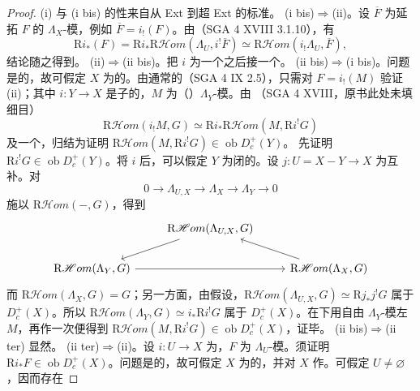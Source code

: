 \begin{proof}
(i) 与 (i bis) 的性来自从 Ext 到超 Ext 的标准。
(i bis)$\Rightarrow$(ii)。设 $\overline F$ 为延拓 $F$ 的 $\Lambda_X$-模，例如 $\overline F=i_!(F)$。由（SGA 4 XVIII 3.1.10），有
\[
\mathrm Ri_*(F)=\mathrm Ri_*\mathrm R\mathscr Hom(\Lambda_U,i^!\overline F)
\simeq\mathrm R\mathscr Hom(i_!\Lambda_U,\overline F),
\]
结论随之得到。
(ii)$\Rightarrow$(ii bis)。把 $i$ 为一个之后接一个。
(ii bis)$\Rightarrow$(i bis)。问题是的，故可假定 $X$ 为的。由通常的（SGA 4 IX 2.5），只需对 $F=i_!(M)$ 验证 (ii)；其中 $i:Y\to X$ 是子的，$M$ 为（）$\Lambda_Y$-模。由
（SGA 4 XVIII，原书此处未填细目）
\[
\mathrm R\mathscr Hom(i_!M,G)\simeq\mathrm Ri_*\mathrm R\mathscr Hom(M,\mathrm Ri^!G)
\]
及一个，归结为证明 $\mathrm R\mathscr Hom(M,\mathrm Ri^!G)\in\operatorname{ob}D_c^+(Y)$。
先证明 $\mathrm Ri^!G\in\operatorname{ob}D_c^+(Y)$。将 $i$ 后，可以假定 $Y$ 为闭的。设 $j:U=X-Y\to X$ 为互补。对
\[0\longrightarrow\Lambda_{U,X}\longrightarrow\Lambda_X\longrightarrow\Lambda_Y\longrightarrow0\]
施以 $\mathrm R\mathscr Hom(-,G)$，得到
\[
\begin{tikzcd}
&\mathrm R\mathscr Hom(\Lambda_{U,X},G)\arrow[dl]\\
\mathrm R\mathscr Hom(\Lambda_Y,G)\arrow[rr]&&\mathrm R\mathscr Hom(\Lambda_X,G)\arrow[ul]
\end{tikzcd}
\]
而 $\mathrm R\mathscr Hom(\Lambda_X,G)=G$；另一方面，由假设，$\mathrm R\mathscr Hom(\Lambda_{U,X},G)\simeq\mathrm Rj_*j^!G$ 属于 $D_c^+(X)$。所以 $\mathrm R\mathscr Hom(\Lambda_Y,G)\simeq i_*\mathrm Ri^!G$ 属于 $D_c^+(X)$。在下用自由 $\Lambda_Y$-模左 $M$，再作一次便得到 $\mathrm R\mathscr Hom(M,\mathrm Ri^!G)\in\operatorname{ob}D_c^+(X)$，证毕。
(ii bis)$\Rightarrow$(ii ter) 显然。
(ii ter)$\Rightarrow$(ii)。设 $i:U\to X$ 为，$F$ 为 $\Lambda_U$-模。须证明 $\mathrm Ri_*F\in\operatorname{ob}D_c^+(X)$。问题是的，故可假定 $X$ 为的，并对 $X$ 作。可假定 $U\ne\varnothing$，因而存在

\end{proof}
